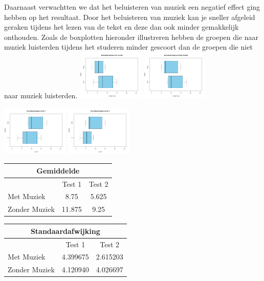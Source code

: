 \documentclass{hogent-article}
\begin{document}
	Daarnaast verwachtten we dat het beluisteren van muziek een negatief effect ging hebben op het resultaat. Door het beluisteren van muziek kan je sneller afgeleid geraken tijdens het lezen van de tekst en deze dan ook minder gemakkelijk onthouden. Zoals de boxplotten hieronder illustreren hebben de groepen die naar muziek luisterden tijdens het studeren minder gescoort dan de groepen die niet naar muziek luisterden.
	\includegraphics[width=120px]{Verwacht_Muziek}
	\includegraphics[width=120px]{Verwacht_ZonderMuziek}
	
	\includegraphics[width=120px]{Verwacht_Muziek_Score1}
	\includegraphics[width=120px]{Verwacht_Muziek_Score2}
	
	\begin{tabular}{ |p{10em}|c|c| }
	\hline
		\multicolumn{3}{|c|}{Gemiddelde} \\
	\hline
		& Test 1 & Test 2 \\
	\hline
		Met Muziek & 8.75  & 5.625 \\
		Zonder Muziek & 11.875 & 9.25 \\
	\hline
	\end{tabular}
	
	\begin{tabular}{ |p{10em}|c|c| }
	\hline
		\multicolumn{3}{|c|}{Standaardafwijking} \\
	\hline
		& Test 1 & Test 2 \\
	\hline
		Met Muziek & 4.399675  & 2.615203 \\
		Zonder Muziek & 4.120940 & 4.026697 \\
	\hline
	\end{tabular}
	
\end{document}
